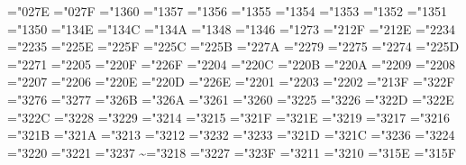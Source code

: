 \mathchardef\heartsuit="027E
\mathchardef\spadesuit="027F
\mathchardef\coprod="1360
\mathchardef\bigvee="1357
\mathchardef\bigwedge="1356
\mathchardef\biguplus="1355
\mathchardef\bigcap="1354
\mathchardef\bigcup="1353
\mathchardef\intop="1352 \def\int{\intop\nolimits}
\mathchardef\prod="1351
\mathchardef\sum="1350
\mathchardef\bigotimes="134E
\mathchardef\bigoplus="134C
\mathchardef\bigodot="134A
\mathchardef\ointop="1348 \def\oint{\ointop\nolimits}
\mathchardef\bigsqcup="1346
\mathchardef\smallint="1273
\mathchardef\triangleleft="212F
\mathchardef\triangleright="212E
\mathchardef\bigtriangleup="2234
\mathchardef\bigtriangledown="2235
\mathchardef\wedge="225E \let\land=\wedge
\mathchardef\vee="225F \let\lor=\vee
\mathchardef\cap="225C
\mathchardef\cup="225B
\mathchardef\ddagger="227A
\mathchardef\dagger="2279
\mathchardef\sqcap="2275
\mathchardef\sqcup="2274
\mathchardef\uplus="225D
\mathchardef\amalg="2271
\mathchardef\diamond="2205
\mathchardef\bullet="220F
\mathchardef\wr="226F
\mathchardef\div="2204
\mathchardef\odot="220C
\mathchardef\oslash="220B
\mathchardef\otimes="220A
\mathchardef\ominus="2209
\mathchardef\oplus="2208
\mathchardef\mp="2207
\mathchardef\pm="2206
\mathchardef\circ="220E
\mathchardef\bigcirc="220D
\mathchardef\setminus="226E %
\mathchardef\cdot="2201
\mathchardef\ast="2203
\mathchardef\times="2202
\mathchardef\star="213F
\mathchardef\propto="322F
\mathchardef\sqsubseteq="3276
\mathchardef\sqsupseteq="3277
\mathchardef\parallel="326B
\mathchardef\mid="326A
\mathchardef\dashv="3261
\mathchardef\vdash="3260
\mathchardef\nearrow="3225
\mathchardef\searrow="3226
\mathchardef\nwarrow="322D
\mathchardef\swarrow="322E
\mathchardef\Leftrightarrow="322C
\mathchardef\Leftarrow="3228
\mathchardef\Rightarrow="3229
\def\neq{\not=} \let\ne=\neq
\mathchardef\leq="3214 \let\le=\leq
\mathchardef\geq="3215 \let\ge=\geq
\mathchardef\succ="321F
\mathchardef\prec="321E
\mathchardef\approx="3219
\mathchardef\succeq="3217
\mathchardef\preceq="3216
\mathchardef\supset="321B
\mathchardef\subset="321A
\mathchardef\supseteq="3213
\mathchardef\subseteq="3212
\mathchardef\in="3232
\mathchardef\ni="3233 \let\owns=\ni
\mathchardef\gg="321D
\mathchardef\ll="321C
\mathchardef\not="3236
\mathchardef\leftrightarrow="3224
\mathchardef\leftarrow="3220 \let\gets=\leftarrow
\mathchardef\rightarrow="3221 \let\to=\rightarrow
\mathchardef\mapstochar="3237 \def\mapsto{\mapstochar\rightarrow}
\mathchardef\sim="3218
\mathchardef\simeq="3227
\mathchardef\perp="323F
\mathchardef\equiv="3211
\mathchardef\asymp="3210
\mathchardef\smile="315E
\mathchardef\frown="315F
